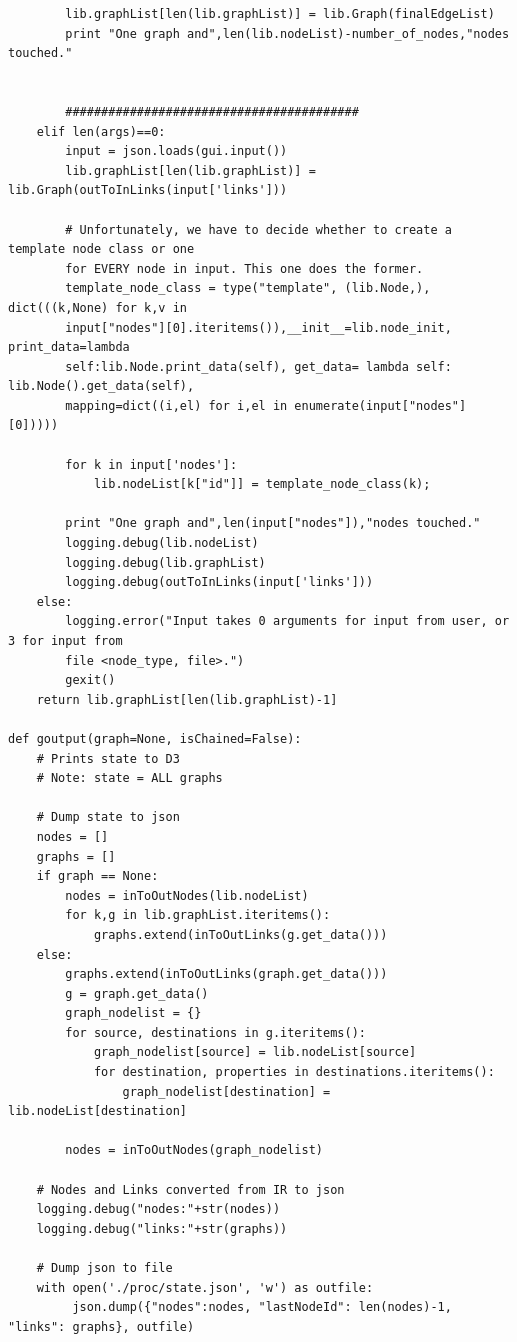 \documentclass[a4paper]{article}
\begin{document}
\begin{verbatim}
        lib.graphList[len(lib.graphList)] = lib.Graph(finalEdgeList)
        print "One graph and",len(lib.nodeList)-number_of_nodes,"nodes touched."

        
        #########################################
    elif len(args)==0:
        input = json.loads(gui.input())
        lib.graphList[len(lib.graphList)] = lib.Graph(outToInLinks(input['links']))

        # Unfortunately, we have to decide whether to create a template node class or one 
        for EVERY node in input. This one does the former.
        template_node_class = type("template", (lib.Node,), dict(((k,None) for k,v in 
        input["nodes"][0].iteritems()),__init__=lib.node_init, print_data=lambda 
        self:lib.Node.print_data(self), get_data= lambda self: lib.Node().get_data(self), 
        mapping=dict((i,el) for i,el in enumerate(input["nodes"][0]))))
    
        for k in input['nodes']:
            lib.nodeList[k["id"]] = template_node_class(k);

        print "One graph and",len(input["nodes"]),"nodes touched."
        logging.debug(lib.nodeList)
        logging.debug(lib.graphList)
        logging.debug(outToInLinks(input['links']))
    else:
        logging.error("Input takes 0 arguments for input from user, or 3 for input from 
        file <node_type, file>.")
        gexit()
    return lib.graphList[len(lib.graphList)-1]

def goutput(graph=None, isChained=False):
    # Prints state to D3
    # Note: state = ALL graphs

    # Dump state to json
    nodes = []
    graphs = []
    if graph == None:
        nodes = inToOutNodes(lib.nodeList)
        for k,g in lib.graphList.iteritems():
            graphs.extend(inToOutLinks(g.get_data()))
    else:
        graphs.extend(inToOutLinks(graph.get_data()))
        g = graph.get_data()
        graph_nodelist = {}
        for source, destinations in g.iteritems():
            graph_nodelist[source] = lib.nodeList[source]
            for destination, properties in destinations.iteritems():
                graph_nodelist[destination] = lib.nodeList[destination]

        nodes = inToOutNodes(graph_nodelist)

    # Nodes and Links converted from IR to json
    logging.debug("nodes:"+str(nodes))
    logging.debug("links:"+str(graphs))

    # Dump json to file
    with open('./proc/state.json', 'w') as outfile:
         json.dump({"nodes":nodes, "lastNodeId": len(nodes)-1, "links": graphs}, outfile)


\end{verbatim}
\end{document}
